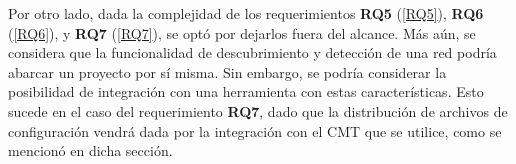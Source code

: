 Por otro lado, dada la complejidad de los requerimientos \textbf{RQ5} (\ref{RQ5}), \textbf{RQ6} (\ref{RQ6}), y \textbf{RQ7} (\ref{RQ7}), se optó por dejarlos fuera del alcance. Más aún, se considera que la funcionalidad de descubrimiento y detección de una red podría abarcar un proyecto por sí misma. Sin embargo, se podría considerar la posibilidad de integración con una herramienta con estas características. Esto sucede en el caso del requerimiento \textbf{RQ7}, dado que la distribución de archivos de configuración vendrá dada por la integración con el CMT que se utilice, como se mencionó en dicha sección.
